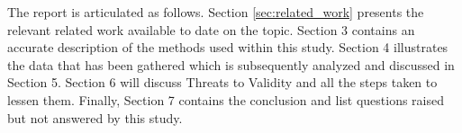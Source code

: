 The report is articulated as follows. Section \ref{sec:related_work} presents the relevant related work available to date on the topic. Section 3 contains an accurate description of the methods used within this study. Section 4 illustrates the data that has been gathered which is subsequently analyzed and discussed in Section 5. Section 6 will discuss Threats to Validity and all the steps taken to lessen them. Finally, Section 7 contains the conclusion and list questions raised but not answered by this study.


